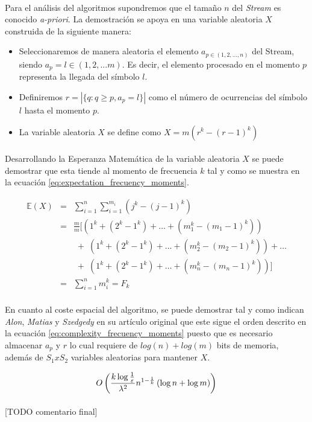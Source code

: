 \documentclass{subfiles}
\begin{document}
      \paragraph{}
      Para el análisis del algoritmos supondremos que el tamaño $n$ del \emph{Stream} es conocido \emph{a-priori}. La demostración se apoya en una variable aleatoria $X$ construida de la siguiente manera:

      \begin{itemize}
        \item Seleccionaremos de manera aleatoria el elemento $a_{p \in (1,2,...,n)}$ del Stream, siendo $a_p = l \in (1,2,...m)$. Es decir, el elemento procesado en el momento $p$ representa la llegada del símbolo $l$.
        \item Definiremos $r=|\{q:q\geq p,a_{p}=l\}|$ como el número de ocurrencias del símbolo $l$ hasta el momento $p$.
        \item La variable aleatoria $X$ se define como $X=m(r^{k}-(r-1)^{k})$
      \end{itemize}

      \paragraph{}
      Desarrollando la Esperanza Matemática de la variable aleatoria $X$ se puede demostrar que esta tiende al momento de frecuencia $k$ tal y como se muestra en la ecuación \eqref{eq:expectation_frecuency_moments}.

      \begin{equation}
      \label{eq:expectation_frecuency_moments}
        {\displaystyle {\begin{array}{lll}\mathbb{E}(X)&=&\sum _{i=1}^{n}\sum _{i=1}^{m_{i}}(j^{k}-(j-1)^{k})\\&=&{\frac {m}{m}}[(1^{k}+(2^{k}-1^{k})+\ldots +(m_{1}^{k}-(m_{1}-1)^{k}))\\&&\;+\;(1^{k}+(2^{k}-1^{k})+\ldots +(m_{2}^{k}-(m_{2}-1)^{k}))+\ldots \\&&\;+\;(1^{k}+(2^{k}-1^{k})+\ldots +(m_{n}^{k}-(m_{n}-1)^{k}))]\\&=&\sum _{i=1}^{n}m_{i}^{k}=F_{k}\end{array}}}
      \end{equation}

      \paragraph{}
      En cuanto al coste espacial del algoritmo, se puede demostrar tal y como indican \emph{Alon}, \emph{Matias} y \emph{Szedgedy} en su artículo original \cite{alon1996space} que este sigue el orden descrito en la ecuación \eqref{eq:complexity_frecuency_moments} puesto que es necesario almacenar $a_p$ y $r$ lo cual requiere de $log(n) + log(m)$ bits de memoria, además de $S_1 x S_2$ variables aleatorias para mantener $X$.

      \begin{equation}
      \label{eq:complexity_frecuency_moments}
        {\displaystyle O\left({\dfrac {k\log {1 \over \varepsilon }}{\lambda ^{2}}}n^{1-{1 \over k}}\left(\log n+\log m\right)\right)}
      \end{equation}


      \paragraph{}
      [TODO comentario final]
\end{document}
